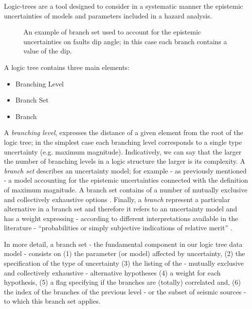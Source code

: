 Logic-trees are a tool designed to consider in a systematic manner the 
epistemic uncertainties of models and parameters included in a hazard 
analysis.
\renewcommand{\psedge}{\ncdiag[armA=0,angleB=180,armB=1cm]}
\begin{figure}[!hb]

\caption{An example of branch set used to account for the epistemic 
uncertainties on faults dip angle; in this case each branch contains a value 
of the dip.}
\label{fig:logic_tree_branching_levels}
\end{figure}

A logic tree cont\-ains three main elements:
\begin{itemize}
\item Branching Level
\item Branch Set
\item Branch
\end{itemize}
%
A \emph{branching level}, expresses the distance of a given element from the 
root of the logic tree; in the simplest case each branching level corresponds 
to a single type uncertainty (e.g. maximum magnitude). 
Indicatively, we can say that the larger the number of branching levels in a 
logic structure the larger is its complexity.
%
A \emph{branch set} describes an uncertainty model; for example - as previously 
mentioned - a model accounting for the epistemic uncertainties connected with 
the definition of maximum magnitude. A branch set contains of a number of 
mutually exclusive and collectively exhaustive options \citep{bommer2008}. 
%
Finally, a \emph{branch} represent a particular alternative in a branch set and 
therefore it refers to an uncertainty model and has a weight expressing - 
according to different interpretations available in the literature 
- ``probabilities or simply subjective indications of relative merit'' 
\citep[][page 999]{bommer2008}.

%
In more detail, a branch set - the fundamental component in our logic tree data 
model - consists on (1) the parameter (or model) affected 
by uncertainty, (2) the specification of the type of uncertainty (3) the 
listing of the - mutually exclusive and collectively exhaustive 
- alternative hypotheses (4) a weight for each hypothesis, 
(5) a flag specifying if the branches are (totally) correlated and, (6) the 
index of the branches of the previous level - or the subset of seismic 
sources - to which this branch set applies.

